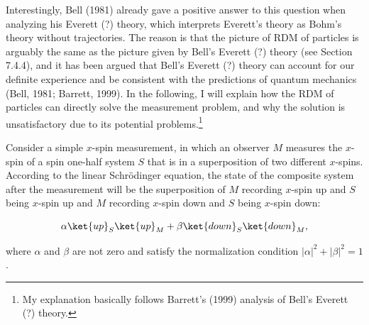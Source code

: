 Interestingly, Bell (1981) already gave a positive answer to this question when analyzing his Everett (?) theory, which interprets Everett's theory as Bohm's theory without trajectories.
The reason is that the picture of RDM of particles is arguably the same as the picture given by Bell's Everett (?) theory (see Section 7.4.4), and it has been argued that Bell's Everett (?) theory can account for our definite experience and be consistent with the predictions of quantum mechanics (Bell, 1981; Barrett, 1999).
In the following, I will explain how the RDM of particles can directly solve the measurement problem, and  why the solution is unsatisfactory due to its potential problems.\footnote{My explanation basically follows Barrett's (1999) analysis of Bell's Everett (?) theory.}

Consider a simple $x$-spin measurement, in which an observer $M$ measures the $x$-spin of a spin one-half system $S$ that is in a superposition of two different $x$-spins. According to the linear Schr\"{o}dinger equation, the state of the composite system after the measurement will be the superposition of $M$ recording $x$-spin up and $S$ being $x$-spin up and $M$ recording $x$-spin down and $S$ being $x$-spin down:

\begin{equation}
\alpha \ket{up}_S \ket{up}_M+\beta \ket{down}_S \ket{down}_M,
\label{}
\end{equation}

\noindent  where $\alpha$ and $\beta$ are not zero and satisfy the normalization condition $|\alpha|^2+|\beta|^2=1$.



